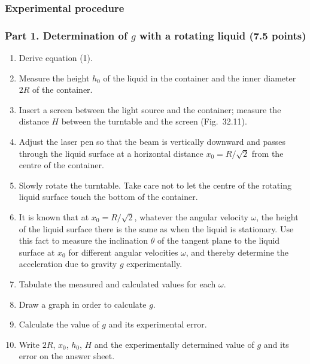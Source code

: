 \subsubsection*{Experimental procedure}

\subsubsection*{Part 1. Determination of $g$ with a rotating liquid (7.5 points)}

\begin{enumerate}
\item[(1)] Derive equation (1).
\item[(2)] Measure the height $h_0$ of the liquid in the container and the inner diameter $2R$ of the container.
\item[(3)] Insert a screen between the light source and the container; measure the distance $H$ between the turntable and the screen (Fig.~32.11).
\item[(4)] Adjust the laser pen so that the beam is vertically downward and passes through the liquid surface at a horizontal distance $x_0=R/\sqrt{2}$ from the centre of the container.
\item[(5)] Slowly rotate the turntable. Take care not to let the centre of the rotating liquid surface touch the bottom of the container.
\item[(6)] It is known that at $x_0=R/\sqrt{2}$, whatever the angular velocity $\omega$, the height of the liquid surface there is the same as when the liquid is stationary. Use this fact to measure the inclination $\theta$ of the tangent plane to the liquid surface at $x_0$ for different angular velocities $\omega$, and thereby determine the acceleration due to gravity $g$ experimentally.
\item[(7)] Tabulate the measured and calculated values for each $\omega$.
\item[(8)] Draw a graph in order to calculate $g$.
\item[(9)] Calculate the value of $g$ and its experimental error.
\item[(10)] Write $2R$, $x_0$, $h_0$, $H$ and the experimentally determined value of $g$ and its error on the answer sheet.
\end{enumerate}

